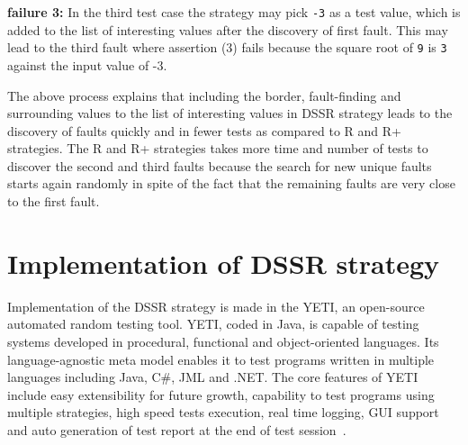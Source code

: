 \documentclass[conference]{IEEEtran}
\begin{document}
\noindent \textbf{failure 3:} In the third test case the strategy may pick \verb+-3+ as a test value, which is added to the list of interesting values after the discovery of first fault. This may lead to the third fault where assertion (3) fails because the square root of \verb+9+ is \verb+3+ against the input value of -3.



\noindent The above process explains that including the border, fault-finding and surrounding values to the list of interesting values in DSSR strategy leads to the discovery of faults quickly and in fewer tests as compared to R and R+ strategies. The R and R+ strategies takes more time and number of tests to discover the second and third faults because the search for new unique faults starts again randomly in spite of the fact that the remaining faults are very close to the first fault.




\section{Implementation of DSSR strategy}\label{sec:imp}
\noindent Implementation of the DSSR strategy is made in the YETI, an open-source automated random testing tool. YETI, coded in Java, is capable of testing systems developed in procedural, functional and object-oriented languages. Its language-agnostic meta model enables it to test programs written in multiple languages including Java, C\#, JML and .NET. The core features of YETI include easy extensibility for future growth, capability to test programs using multiple strategies, high speed tests execution, real time logging, GUI support and auto generation of test report at the end of test session~\cite{Oriol2012, Oriol2011}.

\end{document}
